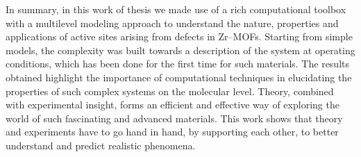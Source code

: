 \npar
In summary, in this work of thesis we made use of a rich computational toolbox with a multilevel modeling approach to understand the nature, properties and applications of active sites arising from defects in Zr--MOFs. Starting from simple models, the complexity was built towards a description of the system at operating conditions, which has been done for the first time for such materials. The results obtained highlight the importance of computational techniques in elucidating the properties of such complex systems on the molecular level. Theory, combined with experimental insight, forms an efficient and effective way of exploring the world of such fascinating and advanced materials. This work shows that theory and experiments have to go hand in hand, by supporting each other, to better understand and predict realistic phenomena.

